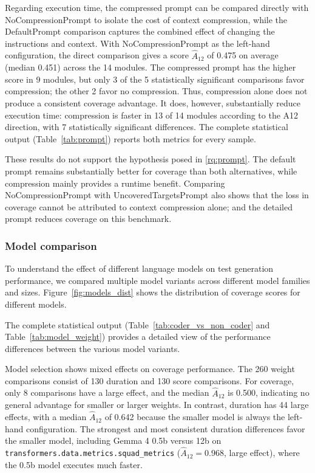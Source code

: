 \documentclass{article}
\begin{document}
Regarding execution time, the compressed prompt can be compared directly with NoCompressionPrompt to isolate the cost of context compression, while the DefaultPrompt comparison captures the combined effect of changing the instructions and context. With NoCompressionPrompt as the left-hand configuration, the direct comparison gives a score $\hat A_{12}$ of 0.475 on average (median 0.451) across the 14 modules. The compressed prompt has the higher score in 9 modules, but only 3 of the 5 statistically significant comparisons favor compression; the other 2 favor no compression. Thus, compression alone does not produce a consistent coverage advantage. It does, however, substantially reduce execution time: compression is faster in 13 of 14 modules according to the A12 direction, with 7 statistically significant differences. The complete statistical output (Table~\ref{tab:prompt}) reports both metrics for every sample.

These results do not support the hypothesis posed in \ref{rq:prompt}. The default prompt remains substantially better for coverage than both alternatives, while compression mainly provides a runtime benefit. Comparing NoCompressionPrompt with UncoveredTargetsPrompt also shows that the loss in coverage cannot be attributed to context compression alone; and the detailed prompt reduces coverage on this benchmark.

\subsubsection{Model comparison}

To understand the effect of different language models on test generation performance, we compared multiple model variants across different model families and sizes. Figure~\ref{fig:models_dist} shows the distribution of coverage scores for different models.

The complete statistical output (Table~\ref{tab:coder_vs_non_coder} and Table~\ref{tab:model_weight}) provides a detailed view of the performance differences between the various model variants.

Model selection shows mixed effects on coverage performance. The 260 weight comparisons consist of 130 duration and 130 score comparisons. For coverage, only 8 comparisons have a large effect, and the median $\hat{A}_{12}$ is 0.500, indicating no general advantage for smaller or larger weights. In contrast, duration has 44 large effects, with a median $\hat{A}_{12}$ of 0.642 because the smaller model is always the left-hand configuration. The strongest and most consistent duration differences favor the smaller model, including Gemma 4 0.5b versus 12b on \texttt{transformers\allowbreak .data\allowbreak .metrics\allowbreak .squad\_metrics} ($\hat{A}_{12}=0.968$, large effect), where the 0.5b model executes much faster.
\end{document}
